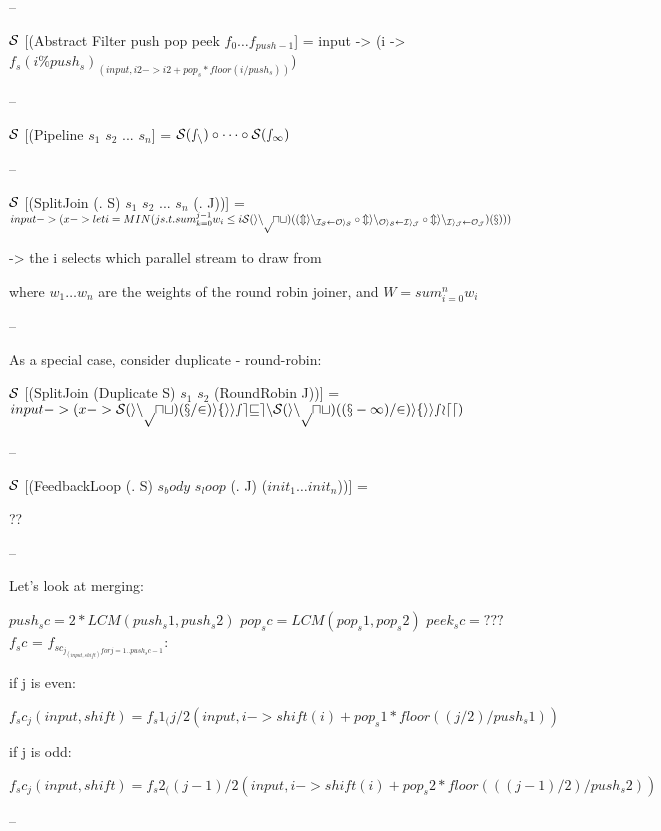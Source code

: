 --

$\cal{S}$ [(Abstract Filter push pop peek $f_0 \dots f_{push-1}$] = input -> 
         (i -> $f_s(i \% push_s)_(input, i2 -> i2 + pop_s * floor(i / push_s))$)

--

$\cal{S}$ [(Pipeline $s_1$ $s_2$ ... $s_n$] = 
           $\cal{S}(s_n) \circ \dots \circ \cal{S}(s_1)$

--

$\cal{S}$ [(SplitJoin (. S) $s_1$ $s_2$ ... $s_n$ (. J))] =
$input -> (x -> let i = MIN(j s.t. sum_{k=0}^{j-1}{w_i} \le i%
                           \cal{S}(input)(
(\mi{I_S}{Oi_S} \circ \mi{Oi_S}{Ii_J} \circ \mi{Ii_J}{O_J})(x)))$

-> the i selects which parallel stream to draw from

where $w_1 \dots w_n$ are the weights of the round robin joiner, and $W =
sum_{i=0}^{n}{w_i}$

--

As a special case, consider duplicate - round-robin:

$\cal{S}$ [(SplitJoin (Duplicate S) $s_1$ $s_2$ (RoundRobin J))] = 
           $input -> (x -> \cal{S}(input)(x/2)      if i is even
                           \cal{S}(input)((x-1)/2)  if i is odd)$

--

$\cal{S}$ 
  [(FeedbackLoop (. S) $s_body$ $s_loop$ (. J) ($init_1 \dots init_n$))] =

??

--

Let's look at merging:

	$push_sc = 2*LCM(push_s1, push_s2)$
	$pop_sc = LCM(pop_s1, pop_s2)$
	$peek_sc = ???$
	$f_sc$ = $f_{sc_{j_(input, shift) for j = 1..push_sc-1}}:$
	
  if j is even:

	$f_sc_j(input, shift) = f_s1_(j/2 %
				(input,
				 i -> shift(i)+pop_s1*floor((j/2)/push_s1))$

  if j is odd:

	$f_sc_j(input, shift) = f_s2_((j-1)/2 %
				(input,
				 i -> shift(i)+pop_s2*floor(((j-1)/2)/push_s2))$

--





